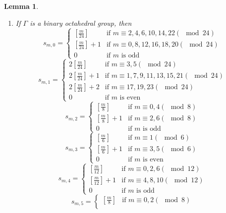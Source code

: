 \documentclass{amsart}[12pt]
\newtheorem{lemma}[theorem]{Lemma}
\theoremstyle{definition}
\theoremstyle{remark}
\numberwithin{equation}{section}
\begin{document}
\begin{lemma}
\begin{enumerate}
\[\begin{cases}
0 & \textrm{if $m$ is odd}
\end{cases}
\]
\[
s_{m, 6} = \begin{cases} 
[\frac{m}{6}] & \textrm{if $m \equiv 3 (\mod 6)$ } \\
[\frac{m}{6}] + 1 & \textrm{if $m \equiv 1, 5 (\mod 6)$ } \\
0 & \textrm{if $m$ is even}
\end{cases}
\]
\item If $\Gamma$ is a binary octahedral group, then 
\[
s_{m, 0} = \begin{cases} 
[\frac{m}{24}] & \textrm{if $m \equiv 2, 4, 6, 10, 14, 22 (\mod 24)$ } \\
[\frac{m}{24}] + 1 & \textrm{if $m \equiv 0, 8, 12, 16, 18, 20 (\mod 24)$ } \\
0 & \textrm{if $m$ is odd}
\end{cases}
\]
\[
s_{m, 1}  = \begin{cases} 
2[\frac{m}{24}] & \textrm{if $m \equiv 3, 5 (\mod 24)$ } \\
2[\frac{m}{24}] + 1 & \textrm{if $m \equiv 1, 7, 9, 11, 13, 15, 21 (\mod 24)$ } \\
2[\frac{m}{24}] + 2 & \textrm{if $m \equiv 17, 19, 23 (\mod 24)$ } \\
0 & \textrm{if $m$ is even}
\end{cases}
\]
\[
s_{m, 2}  = \begin{cases} 
[\frac{m}{8}] & \textrm{if $m \equiv 0, 4 (\mod 8)$ } \\
[\frac{m}{8}] + 1 & \textrm{if $m \equiv 2, 6 (\mod 8)$ } \\
0 & \textrm{if $m$ is odd}
\end{cases}
\]
\[
s_{m, 3}  = \begin{cases} 
[\frac{m}{6}] & \textrm{if $m \equiv 1 (\mod 6)$ } \\
[\frac{m}{6}] + 1 & \textrm{if $m \equiv 3, 5 (\mod 6)$ } \\
0 & \textrm{if $m$ is even}
\end{cases}
\]
\[
s_{m, 4} = \begin{cases} 
[\frac{m}{12}] & \textrm{if $m \equiv 0, 2, 6 (\mod 12)$ } \\
[\frac{m}{12}] + 1 & \textrm{if $m \equiv 4, 8, 10 (\mod 12)$ } \\
0 & \textrm{if $m$ is odd}
\end{cases}
\]
\[
s_{m, 5} = \begin{cases} 
[\frac{m}{8}] & \textrm{if $m \equiv 0, 2 (\mod 8)$ } \\

\end{cases}\]
\end{enumerate}
\end{lemma}
\end{document}
